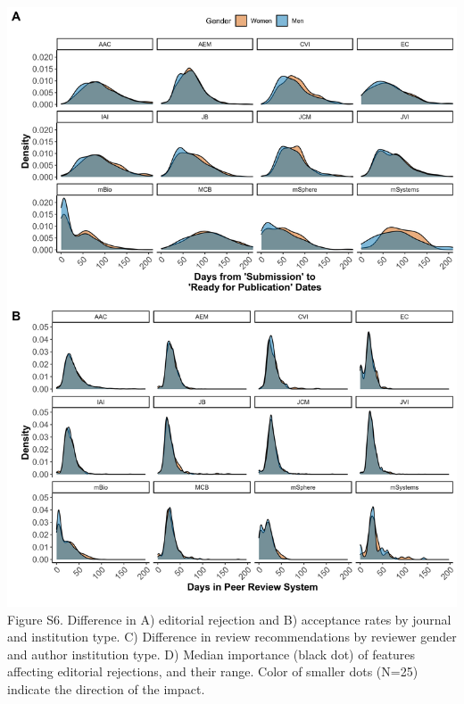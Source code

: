 \documentclass[11pt,]{article}
\begin{document}
\includegraphics{Figure_S6.png} Figure S6. Difference in A) editorial
rejection and B) acceptance rates by journal and institution type. C)
Difference in review recommendations by reviewer gender and author
institution type. D) Median importance (black dot) of features affecting
editorial rejections, and their range. Color of smaller dots (N=25)
indicate the direction of the impact.

\newpage
\end{document}
